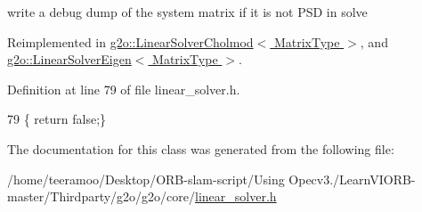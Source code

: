 write a debug dump of the system matrix if it is not P\+SD in solve 



Reimplemented in \hyperlink{classg2o_1_1LinearSolverCholmod_a84ac87445e40dc2af7fd78dda84eaf8d}{g2o\+::\+Linear\+Solver\+Cholmod$<$ Matrix\+Type $>$}, and \hyperlink{classg2o_1_1LinearSolverEigen_a6b70f3c7b1c8c8105c05c7c560c670c2}{g2o\+::\+Linear\+Solver\+Eigen$<$ Matrix\+Type $>$}.



Definition at line 79 of file linear\+\_\+solver.\+h.


\begin{DoxyCode}
79 \{ \textcolor{keywordflow}{return} \textcolor{keyword}{false};\}
\end{DoxyCode}


The documentation for this class was generated from the following file\+:\begin{DoxyCompactItemize}
\item 
/home/teeramoo/\+Desktop/\+O\+R\+B-\/slam-\/script/\+Using Opecv3./\+Learn\+V\+I\+O\+R\+B-\/master/\+Thirdparty/g2o/g2o/core/\hyperlink{linear__solver_8h}{linear\+\_\+solver.\+h}\end{DoxyCompactItemize}
